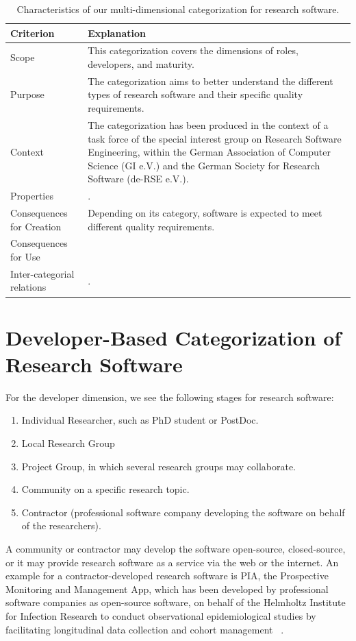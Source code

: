 \documentclass{IEEEcsmag}
\begin{document}
\begin{table}[bt]
    \centering
    \begin{tabularx}{\textwidth}{l X}
    \toprule
        Criterion & Explanation \\
    \midrule
        Scope & This categorization covers the dimensions of roles, developers, and maturity. \\
        Purpose & The categorization aims to better understand the different types of research software and their specific quality requirements.\\
        Context & The categorization has been produced in the context of a task force of the special interest group on Research Software Engineering, within the German Association of Computer Science (GI e.V.) and the German Society for Research Software (de-RSE e.V.). \\
        Properties & . \\
        Consequences for Creation & Depending on its category, software is expected to meet different quality requirements.\\
        Consequences for Use &  \\
        Inter-categorial relations & .\\
    \bottomrule
    \end{tabularx}
    \caption{Characteristics of our multi-dimensional categorization for research software.}
    \label{table:Our-categorization}
\end{table}

\section{Developer-Based Categorization of Research Software}

For the developer dimension, we see the following stages for research software:
\begin{enumerate}
	\item Individual Researcher, such as PhD student or PostDoc.
	\item Local Research Group
	\item Project Group, in which several research groups may collaborate.
	\item Community on a specific research topic.
	\item Contractor (professional software company developing the software on behalf of the researchers).
\end{enumerate}
A community or contractor may develop the software open-source, closed-source, or it may provide research software as a service via the web or the internet. An example for a contractor-developed research software is PIA, the Prospective Monitoring and Management App, which has been developed by professional software companies as open-source software, on behalf of the Helmholtz Institute for Infection Research to conduct observational epidemiological studies by facilitating longitudinal data collection and cohort management ~\cite{HEISE2022100931}.
\end{document}

